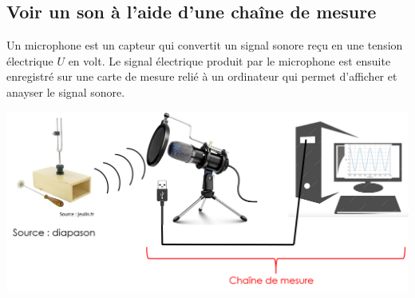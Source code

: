 \subsection{\og Voir \fg un son à l'aide d'une chaîne de mesure}
\begin{tcolorbox}[colback=green!5!white,colframe=green!75!black,title=\textbf{Microphone et enregistrement:}]
Un microphone est un capteur qui convertit un signal sonore reçu en une tension électrique $U$ en volt. Le signal électrique produit par le microphone est ensuite enregistré sur une carte de mesure relié à un ordinateur qui permet d'afficher et anayser le signal sonore.
\begin{center}
    \includegraphics[scale = 0.5]{Images/Chapitre_3/Chaine_mesure.png}
\end{center}
\end{tcolorbox}
